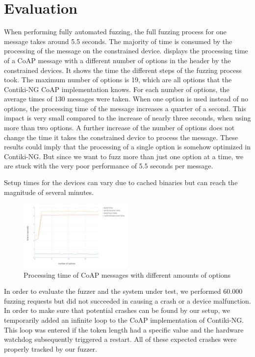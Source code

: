 \section{Evaluation}
\label{section:evaluation}


When performing fully automated fuzzing, the full fuzzing process for one message takes around 5.5 seconds. The majority of time is consumed by the processing of the message on the constrained device.  displays the processing time of a CoAP message with a different number of options in the header by the constrained devices. It shows the time the different steps of the fuzzing process took. The maximum number of options is 19, which are all options that the Contiki-NG CoAP implementation knows. For each number of options, the average times of 130 messages were taken. When one option is used instead of no options, the processing time of the message increases a quarter of a second. This impact is very small compared to the increase of nearly three seconds, when using more than two options. A further increase of the number of options does not change the time it takes the constrained device to process the message. These results could imply that the processing of a single option is somehow optimized in Contiki-NG. But since we want to fuzz more than just one option at a time, we are stuck with the very poor performance of 5.5 seconds per message.

Setup times for the devices can vary due to cached binaries but can reach the magnitude of several minutes.

\begin{figure}[h]
	\centering
	\includegraphics[width=0.5\textwidth]{images/fuzzing_performance}
	\caption{Processing time of CoAP messages with different amounts of options}
	\label{figure:fuzzing_performance}
\end{figure}

In order to evaluate the fuzzer and the system under test, we performed 60.000 fuzzing requests but did not succeeded in causing a crash or a device malfunction. In order to make sure that potential crashes can be found by our setup, we temporarily added an infinite loop to the CoAP implementation of Contiki-NG. This loop was entered if the token length had a specific value and the hardware watchdog subsequently triggered a restart. All of these expected crashes were properly tracked by our fuzzer.